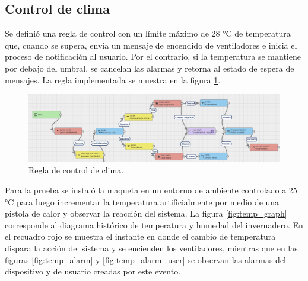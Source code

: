 \pagebreak

\subsection{Control de clima}
\label{sec:Control de clima}

Se definió una regla de control con un límite máximo de 28 °C de temperatura que, cuando se supera, envía un mensaje de encendido de ventiladores e inicia el proceso de notificación  al usuario. Por el contrario, si la temperatura se mantiene por debajo del umbral, se cancelan las alarmas y retorna al estado de espera de mensajes. La regla implementada se muestra en la figura \ref{fig:temp_rule}.  

\begin{figure}[h]
	\centering
	\includegraphics[width=1\textwidth]{./Figures/chapter4/temp_rule.jpg}
	\caption[Regla de control de clima]{Regla de control de clima.}
	\label{fig:temp_rule}
\end{figure}

Para la prueba se instaló la maqueta en un entorno de ambiente controlado a 25 °C para luego incrementar la temperatura artificialmente por medio de una pistola de calor y observar la reacción del sistema. La figura \ref{fig:temp_graph} corresponde al diagrama histórico de temperatura y humedad del invernadero. En el recuadro rojo se muestra el instante en donde el cambio de temperatura dispara la acción del sistema y se encienden los ventiladores, mientras que en las figuras \ref{fig:temp_alarm} y \ref{fig:temp_alarm_user} se observan las alarmas del dispositivo y de usuario creadas por este evento.  









